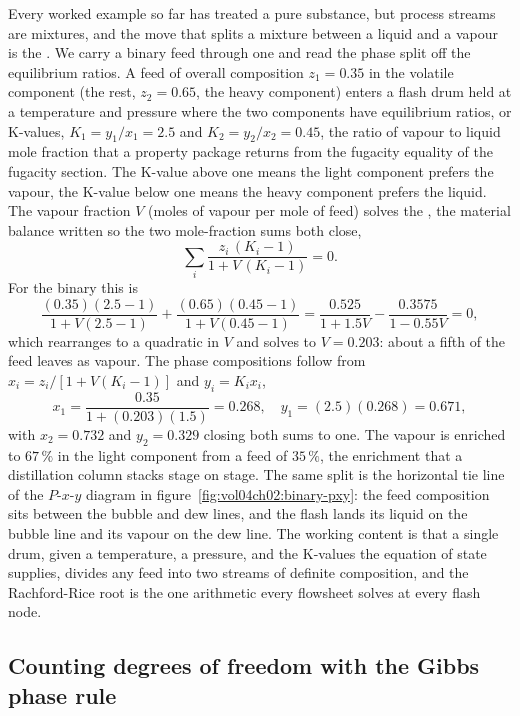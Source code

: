 Every worked example so far has treated a pure substance, but process
streams are mixtures, and the move that splits a mixture between a liquid and
a vapour is the . We carry a binary feed through
one and read the phase split off the equilibrium ratios. A feed of overall
composition $z_1 = 0.35$ in the volatile component (the rest, $z_2 = 0.65$,
the heavy component) enters a flash drum held at a temperature and pressure
where the two components have equilibrium ratios, or K-values, $K_1 = y_1/x_1
= 2.5$ and $K_2 = y_2/x_2 = 0.45$, the ratio of vapour to liquid mole
fraction that a property package returns from the fugacity equality of the
fugacity section. The K-value above one means the light component prefers the
vapour, the K-value below one means the heavy component prefers the liquid.
The vapour fraction $V$ (moles of vapour per mole of feed) solves the
, the material balance written so the two
mole-fraction sums both close,
\[
\sum_i \frac{z_i\,(K_i - 1)}{1 + V\,(K_i - 1)} = 0.
\]
For the binary this is
\[
\frac{(0.35)(2.5 - 1)}{1 + V(2.5 - 1)} + \frac{(0.65)(0.45 - 1)}{1 +
V(0.45 - 1)} = \frac{0.525}{1 + 1.5V} - \frac{0.3575}{1 - 0.55V} = 0,
\]
which rearranges to a quadratic in $V$ and solves to $V = 0.203$: about a
fifth of the feed leaves as vapour. The phase compositions follow from
$x_i = z_i/[1 + V(K_i - 1)]$ and $y_i = K_i x_i$,
\[
x_1 = \frac{0.35}{1 + (0.203)(1.5)} = 0.268, \quad
y_1 = (2.5)(0.268) = 0.671,
\]
with $x_2 = 0.732$ and $y_2 = 0.329$ closing both sums to one. The vapour is
enriched to $67\,\%$ in the light component from a feed of $35\,\%$, the
enrichment that a distillation column stacks stage on stage. The same split
is the horizontal tie line of the $P$-$x$-$y$ diagram in
figure~\ref{fig:vol04ch02:binary-pxy}: the feed composition sits between the
bubble and dew lines, and the flash lands its liquid on the bubble line and
its vapour on the dew line. The working content is that a single drum, given
a temperature, a pressure, and the K-values the equation of state supplies,
divides any feed into two streams of definite composition, and the
Rachford-Rice root is the one arithmetic every flowsheet solves at every
flash node.



\subsection{Counting degrees of freedom with the Gibbs phase rule}

